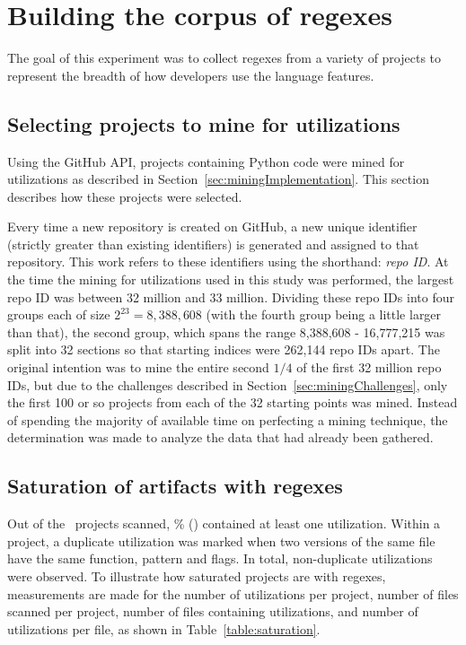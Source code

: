 \section{Building the corpus of regexes}
\label{sec:corpusBuilding}

The goal of this experiment was to collect regexes from a variety of projects to represent the breadth of how developers use the language features.

\subsection{Selecting projects to mine for utilizations}
Using the GitHub API,  projects containing Python code were mined for utilizations as described in Section~\ref{sec:miningImplementation}.  This section describes how these projects were selected.

Every time a new repository is created on GitHub, a new unique identifier (strictly greater than existing identifiers) is generated and assigned to that repository.  This work refers to these identifiers using the shorthand: \emph{repo ID}.  At the time the mining for utilizations used in this study was performed, the largest repo ID was between 32 million and 33 million.  Dividing these repo IDs into four groups each of size $2^23 = 8,388,608$ (with the fourth group being a little larger than that), the second group, which spans the range 8,388,608 - 16,777,215 was split into 32 sections so that starting indices were 262,144 repo IDs apart.  The original intention was to mine the entire second $1/4$ of the first 32 million repo IDs, but due to the challenges described in Section~\ref{sec:miningChallenges}, only the first 100 or so projects from each of the 32 starting points was mined.  Instead of spending the majority of available time on perfecting a mining technique, the determination was made to analyze the data that had already been gathered.



\subsection{Saturation of artifacts with regexes}
Out of the \ projects scanned, \% () contained at least one utilization.  Within a project, a duplicate utilization was marked when two versions of the same file have the same function, pattern and flags.  In total,  non-duplicate utilizations were observed.  To illustrate how saturated projects are with regexes, measurements are made for the number of utilizations per project, number of files scanned per project, number of files containing utilizations, and number of utilizations  per file, as shown in Table~\ref{table:saturation}.

